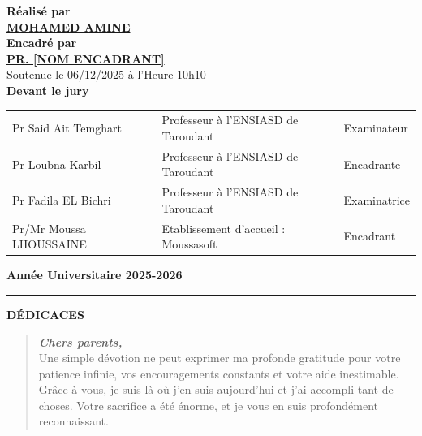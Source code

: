 \documentclass[12pt, a4paper, oneside]{report}
\begin{document}
\begin{titlepage}
\begin{center}
    {\large \textbf{Réalisé par}}\\[5pt]
    {\large \underline{\textbf{MOHAMED AMINE}}}\\[18pt]

    {\large \textbf{Encadré par}}\\[5pt]
    {\large \underline{\textbf{PR. [NOM ENCADRANT]}}}\\[25pt]

    {\medium Soutenue le 06/12/2025 à l'Heure 10h10}\\[25pt]

    {\large \textbf{Devant le jury}}\\[10pt]
    \renewcommand{\arraystretch}{1.3}
    \begin{tabular}{lll}
      Pr Said Ait Temghart & Professeur à l'ENSIASD de Taroudant & Examinateur \\
      Pr Loubna Karbil & Professeur à l'ENSIASD de Taroudant & Encadrante \\
      Pr Fadila EL Bichri & Professeur à l'ENSIASD de Taroudant & Examinatrice \\
      Pr/Mr Moussa LHOUSSAINE & Etablissement d'accueil : Moussasoft & Encadrant \\
    \end{tabular}

    \vfill

    {\bfseries Année Universitaire 2025-2026}\\[12pt]

    {\color{mainblue}\rule{\textwidth}{6pt}}

  \end{center}
\end{titlepage}

\newpage
{}

\thispagestyle{plain}
\vspace*{1cm}
\begin{center}
  {\Huge \textbf{DÉDICACES}}
\end{center}
\vspace{1.5cm}

\begin{quote}
\textit{\large \textbf{Chers parents,}}\\
Une simple dévotion ne peut exprimer ma profonde gratitude pour votre patience infinie, vos encouragements constants et votre aide inestimable. Grâce à vous, je suis là où j'en suis aujourd'hui et j'ai accompli tant de choses. Votre sacrifice a été énorme, et je vous en suis profondément reconnaissant.
\end{quote}
\end{document}
